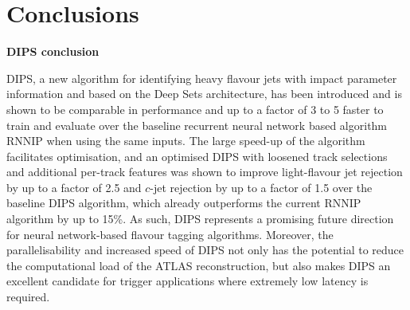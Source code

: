 \chapter{Conclusions}

\textbf{DIPS conclusion}

DIPS, a new algorithm for identifying heavy flavour jets with impact parameter information and based on the Deep Sets architecture, has been introduced and is shown to be comparable in performance and up to a factor of 3 to 5 faster to train and evaluate over the baseline recurrent neural network based algorithm RNNIP when using the same inputs. 
The large speed-up of the algorithm facilitates optimisation, and an optimised DIPS with loosened track selections and additional per-track features was shown to improve light-flavour jet rejection by up to a factor of 2.5 and $c$-jet rejection by up to a factor of 1.5 over the baseline DIPS algorithm, which already outperforms the current RNNIP algorithm by up to 15\%. 
As such, DIPS represents a promising future direction for neural network-based flavour tagging algorithms. 
Moreover, the parallelisability and increased speed of DIPS not only has the potential to reduce the computational load of the ATLAS reconstruction, but also makes DIPS an excellent candidate for trigger applications where extremely low latency is required.
